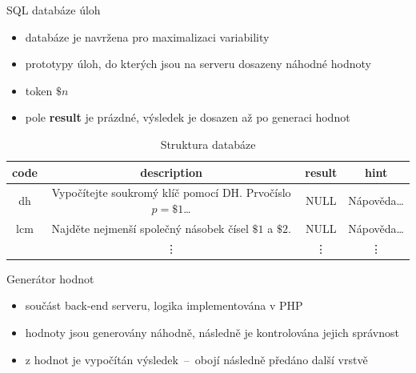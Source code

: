 \documentclass[aspectratio=1610]{beamer}
\begin{document}
\begin{frame}{SQL databáze úloh}
    \begin{itemize}
        \item databáze je navržena pro maximalizaci variability
        \item prototypy úloh, do kterých jsou na serveru dosazeny náhodné hodnoty
        \item token \textbf{$\$n$}
        \item pole \textbf{result} je prázdné, výsledek je dosazen až po generaci hodnot
    \end{itemize}
    \begin{table}
        \caption{Struktura databáze}
        \begin{tabular}[pos]{|c|c|c|c|}
            \hline
            \textbf{code} & \textbf{description} & \textbf{result} & \textbf{hint} \\
            \hline
            \hline
            dh & Vypočítejte soukromý klíč pomocí DH. Prvočíslo $p=\$1$\dots & NULL & Nápověda\dots \\
            \hline
            lcm & Najděte nejmenší společný násobek čísel $\$1$ a $\$2$. & NULL & Nápověda\dots \\
            \hline
            \smash{\vdots} & \vdots & \vdots & \vdots \\
            \hline
        \end{tabular}
    \end{table}
\end{frame}


\begin{frame}[fragile]{Generátor hodnot}
    \begin{itemize}
        \item součást back-end serveru, logika implementována v PHP
        \item hodnoty jsou generovány náhodně, následně je kontrolována jejich správnost
        \item z hodnot je vypočítán výsledek~--~obojí následně předáno další vrstvě
    \end{itemize}
\end{frame}
\end{document}
